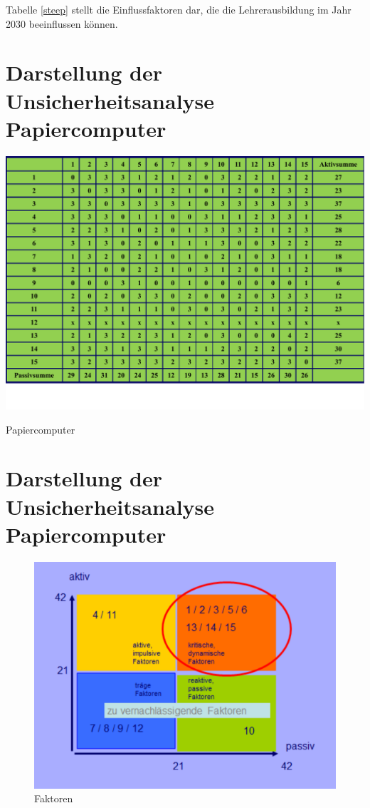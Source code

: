 \documentclass[12pt,a4paper]{article}
\begin{document}
Tabelle \ref{steep} stellt die Einflussfaktoren dar, die die Lehrerausbildung im Jahr 2030 beeinflussen können.

\section{Darstellung der Unsicherheitsanalyse Papiercomputer}
\begin{table}[!ht]
\begin{center}
\includegraphics[scale=0.85,angle=90]{tabelle.pdf}
\caption{Papiercomputer}
\end{center}
\label{tabelle}
\end{table}
\FloatBarrier

\section{Darstellung der Unsicherheitsanalyse Papiercomputer}
\begin{figure}[!ht]
\begin{center}
\includegraphics[scale=0.97,angle=90]{faktoren.pdf}
\caption{Faktoren}
\end{center}
\label{faktoren}
\end{figure}
\FloatBarrier
\end{document}
